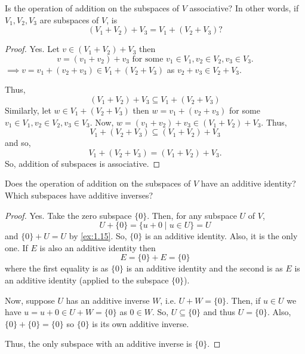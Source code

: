 \begin{exercise}
Is the operation of addition on the subspaces of $V$ associative? In other words, if $V_1, V_2, V_3$ are subspaces of $V$, is
\[
(V_1 + V_2) + V_3 = V_1 + (V_2 + V_3)?
\]
\end{exercise}

\begin{proof}
Yes. Let $v \in (V_1 + V_2) + V_3$ then
\[
v = (v_1 + v_2) + v_3 \text{ for some } v_1 \in V_1, v_2 \in V_2, v_3 \in V_3.
\]
$\implies v = v_1 + (v_2 + v_3) \in V_1 + (V_2 + V_3)$ as $v_2 + v_3 \in V_2 + V_3$.

Thus,
\[
(V_1 + V_2) + V_3 \subseteq V_1 + (V_2 + V_3)
\]
Similarly, let $w \in V_1 + (V_2 + V_3)$ then $w = v_1 + (v_2 + v_3)$ for some $v_1 \in V_1, v_2 \in V_2, v_3 \in V_3$. Now, $w = (v_1 + v_2) + v_3 \in (V_1 + V_2) + V_3$. Thus,
\[
V_1 + (V_2 + V_3) \subseteq (V_1 + V_2) + V_3
\]
and so,
\[
V_1 + (V_2 + V_3) = (V_1 + V_2) + V_3.
\]
So, addition of subspaces is associative.
\end{proof}

\begin{exercise}
Does the operation of addition on the subspaces of $V$ have an additive identity? Which subspaces have additive inverses?
\end{exercise}

\begin{proof}
Yes. Take the zero subspace $\{0\}$. Then, for any subspace $U$ of $V$,
\[
U + \{0\} = \{u + 0 \mid u \in U\} = U
\]
and $\{0\} + U = U$ by \ref{ex:1.15}. So, $\{0\}$ is an additive identity. Also, it is the only one. If $E$ is also an additive identity then
\[
E = \{0\} + E = \{0\}
\]
where the first equality is as $\{0\}$ is an additive identity and the second is as $E$ is an additive identity (applied to the subspace $\{0\}$).

Now, suppose $U$ has an additive inverse $W$, i.e. $U + W = \{0\}$. Then, if $u \in U$ we have $u = u + 0 \in U + W = \{0\}$ as $0 \in W$. So, $U \subseteq \{0\}$ and thus $U = \{0\}$. Also, $\{0\} + \{0\} = \{0\}$ so $\{0\}$ is its own additive inverse.

Thus, the only subspace with an additive inverse is $\{0\}$.
\end{proof}

